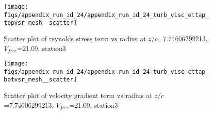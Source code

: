 \begin{figure}[H]
\centering
\texttt{[image: figs/appendix\_run\_id\_24/appendix\_run\_id\_24\_turb\_visc\_ettap\_topvsr\_mesh\_\_scatter]}
\caption{Scatter plot of reynolds stress term vs radius at $z/c$=7.74606299213, $V_{free}$=21.09, station3}
\label{fig:appendix_run_id_24_turb_visc_ettap_topvsr_mesh__scatter}
\end{figure}


\begin{figure}[H]
\centering
\texttt{[image: figs/appendix\_run\_id\_24/appendix\_run\_id\_24\_turb\_visc\_ettap\_botvsr\_mesh\_\_scatter]}
\caption{Scatter plot of velocity gradient term vs radius at $z/c$=7.74606299213, $V_{free}$=21.09, station3}
\label{fig:appendix_run_id_24_turb_visc_ettap_botvsr_mesh__scatter}
\end{figure}


